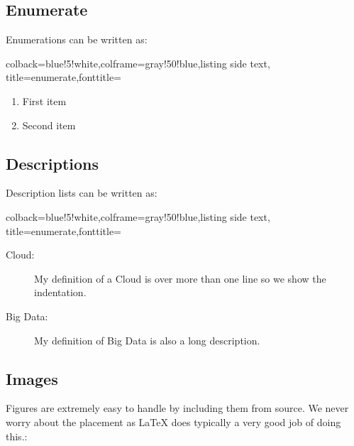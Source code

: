 \subsection{Enumerate}\label{enumerate}

Enumerations can be written as:

\begin{tcblisting}{colback=blue!5!white,colframe=gray!50!blue,listing side text,
  title=enumerate,fonttitle=\bfseries}
\begin{enumerate}
   \item First item
   \item Second item
\end{enumerate}
\end{tcblisting} 

\subsection{Descriptions}\label{descriptions}

Description lists can be written as:

\begin{tcblisting}{colback=blue!5!white,colframe=gray!50!blue,listing side text,
  title=enumerate,fonttitle=\bfseries}
\begin{description}
   \item[Cloud:] My definition of a Cloud is over more than one line
     so we show the indentation.
   \item[Big Data:] My definition of Big Data is also a long description.
\end{description}
\end{tcblisting} 




\subsection{Images}\label{images}

Figures are extremely easy to handle by including them from source. We
never worry about the placement as LaTeX does typically a very
good job of doing this.:

